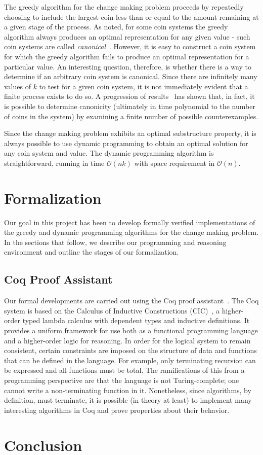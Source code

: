 \documentclass{acm_proc_article-sp}
\begin{document}
The greedy algorithm for the change making problem proceeds by repeatedly choosing to include the largest coin less than or equal to the amount remaining at a given stage of the process. As noted, for some coin systems the greedy algorithm always produces an optimal representation for any given value - such coin systems are called \emph{canonical}~\cite{?}. However, it is easy to construct a coin system for which the greedy algorithm fails to produce an optimal representation for a particular value. An interesting question, therefore, is whether there is a way to determine if an arbitrary coin system is canonical. Since there are infinitely many values of $k$ to test for a given coin system, it is not immediately evident that a finite process exists to do so. A progression of results~\cite{?,?,?} has shown that, in fact, it is possible to determine canonicity (ultimately in time polynomial to the number of coins in the system) by examining a finite number of possible counterexamples. 

Since the change making problem exhibits an optimal substructure property, it is always possible to use dynamic programming to obtain an optimal solution for any coin system and value. The dynamic programming algorithm is straightforward, running in time $\mathcal{O}(nk)$ with space requirement in $\mathcal{O}(n)$. 


\section{Formalization}

Our goal in this project has been to develop formally verified implementations of the greedy and dynamic programming algorithms for the change making problem. In the sections that follow, we describe our programming and reasoning environment and outline the stages of our formalization. 

\subsection{Coq Proof Assistant}
Our formal developments are  carried out using the Coq proof assistant~\cite{coq09}. The Coq system is based on 
the Calculus of Inductive Constructions (CIC)~\cite{paulin93}, a higher-order typed lambda calculus with dependent types and inductive definitions. It provides a uniform framework for use  both as a functional programming language and a higher-order logic for reasoning. In order for the logical system to remain consistent, certain constraints are imposed on the structure of data  and functions that can be defined in the language. For example, only terminating recursion can be expressed and all functions must be total. The ramifications of this from a programming perspective are that the language is not Turing-complete; one cannot write a non-terminating function in it. Nonetheless, since algorithms, by definition, must terminate, it is possible (in theory at least) to implement many interesting algorithms in Coq and prove properties about their behavior. 







\section{Conclusion}




\end{document}
